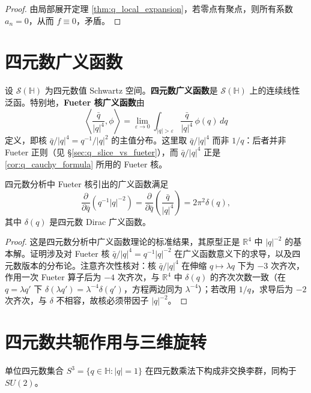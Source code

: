 \begin{proof}
由局部展开定理 \ref{thm:q_local_expansion}，若零点有聚点，则所有系数 $a_n=0$，从而 $f\equiv 0$，矛盾。
\end{proof}

\section{四元数广义函数}

\begin{definition}[四元数广义函数]\label{def:q_generalised}
设 $\mathcal{S}(\mathbb{H})$ 为四元数值 Schwartz 空间。\textbf{四元数广义函数}是 $\mathcal{S}(\mathbb{H})$ 上的连续线性泛函。特别地，\textbf{Fueter 核广义函数}由
\[
\left\langle \frac{\bar q}{|q|^4}, \phi\right\rangle
=\lim_{\varepsilon\to 0}\int_{|q|>\varepsilon}\frac{\bar q}{|q|^4}\,\phi(q)\,dq
\]
定义，即核 $\bar q/|q|^4=q^{-1}/|q|^2$ 的主值分布。这里取 $\bar q/|q|^4$ 而非 $1/q$：后者并非 Fueter 正则（见 \S\ref{sec:q_slice_vs_fueter}），而 $\bar q/|q|^4$ 正是 \ref{cor:q_cauchy_formula} 所用的 Fueter 核。
\end{definition}

\begin{theorem}\label{thm:q_cauchy_kernel_derivative}
四元数分析中 Fueter 核引出的广义函数满足
\[
\frac{\partial}{\partial\bar q}\left(q^{-1}|q|^{-2}\right)
=\frac{\partial}{\partial\bar q}\left(\frac{\bar q}{|q|^4}\right)=2\pi^2\delta(q),
\]
其中 $\delta(q)$ 是四元数 Dirac 广义函数。
\end{theorem}

\begin{proof}
这是四元数分析中广义函数理论的标准结果，其原型正是 $\mathbb{R}^4$ 中 $|q|^{-2}$ 的基本解。证明涉及对 Fueter 核 $\bar q/|q|^4=q^{-1}|q|^{-2}$ 在广义函数意义下的求导，以及四元数版本的分布论。注意齐次性核对：核 $\bar q/|q|^4$ 在伸缩 $q\mapsto\lambda q$ 下为 $-3$ 次齐次，作用一次 Fueter 算子后为 $-4$ 次齐次，与 $\mathbb{R}^4$ 中 $\delta(q)$ 的齐次次数一致（在 $q=\lambda q'$ 下 $\delta(\lambda q')=\lambda^{-4}\delta(q')$，方程两边同为 $\lambda^{-4}$）；若改用 $1/q$，求导后为 $-2$ 次齐次，与 $\delta$ 不相容，故核必须带因子 $|q|^{-2}$。
\end{proof}

\section{四元数共轭作用与三维旋转}

\begin{theorem}[单位四元数群]\label{thm:q_unit_sphere}
单位四元数集合 $S^3=\{q\in\mathbb{H}:|q|=1\}$ 在四元数乘法下构成非交换李群，同构于 $SU(2)$。
\end{theorem}

